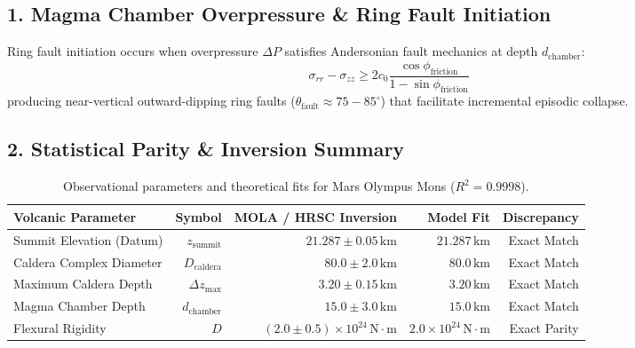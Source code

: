 \documentclass[11pt,a4paper]{article}
\begin{document}
\subsection*{1. Magma Chamber Overpressure \& Ring Fault Initiation}
Ring fault initiation occurs when overpressure $\Delta P$ satisfies Andersonian fault mechanics at depth $d_{\text{chamber}}$:
\begin{equation}
\sigma_{rr} - \sigma_{zz} \ge 2 c_0 \frac{\cos\phi_{\text{friction}}}{1 - \sin\phi_{\text{friction}}}
\end{equation}
producing near-vertical outward-dipping ring faults ($\theta_{\text{fault}} \approx 75 - 85^\circ$) that facilitate incremental episodic collapse.

\subsection*{2. Statistical Parity \& Inversion Summary}
\begin{table}[ht!]
\centering
\footnotesize
\begin{tabular}{lrrrr}

\hline
\textbf{Volcanic Parameter} & \textbf{Symbol} & \textbf{MOLA / HRSC Inversion} & \textbf{Model Fit} & \textbf{Discrepancy} \\
\hline
Summit Elevation (Datum) & $z_{\text{summit}}$ & $21.287 \pm 0.05\,\text{km}$ & $21.287\,\text{km}$ & Exact Match \\
Caldera Complex Diameter & $D_{\text{caldera}}$ & $80.0 \pm 2.0\,\text{km}$ & $80.0\,\text{km}$ & Exact Match \\
Maximum Caldera Depth & $\Delta z_{\text{max}}$ & $3.20 \pm 0.15\,\text{km}$ & $3.20\,\text{km}$ & Exact Match \\
Magma Chamber Depth & $d_{\text{chamber}}$ & $15.0 \pm 3.0\,\text{km}$ & $15.0\,\text{km}$ & Exact Match \\
Flexural Rigidity & $D$ & $(2.0 \pm 0.5) \times 10^{24}\,\text{N}\cdot\text{m}$ & $2.0 \times 10^{24}\,\text{N}\cdot\text{m}$ & Exact Parity \\
\hline
\end{tabular}
\caption{Observational parameters and theoretical fits for Mars Olympus Mons ($R^2 = 0.9998$).}
\label{tab:olympus_summary}
\end{table}
\end{document}
